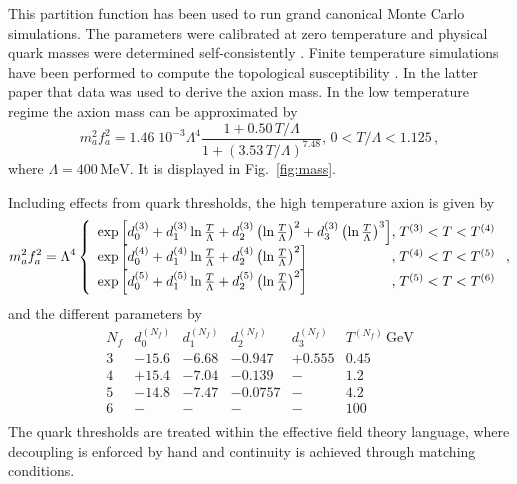 \documentclass[preprint,nofootinbib]{revtex4}
\newcommand{\reffig}[1]{Fig.~\ref{#1}}
\newcommand{\units}[1]{\, \mathrm{#1}}
\begin{document}
This partition function has been used to run grand canonical Monte Carlo simulations. The parameters were calibrated at zero temperature and physical quark masses were determined self-consistently \cite{wantz:iilm:1}. Finite temperature simulations have been performed to compute the topological susceptibility \cite{wantz:iilm:3}. In the latter paper that data was used to derive the axion mass. In the low temperature regime the axion mass can be approximated by
\begin{equation}
m^2_a f^2_a = 1.46\;10^{-3}\Lambda^4 \frac{1+0.50\,T/\Lambda}{\displaystyle 1+\left(3.53\, T/\Lambda\right)^{7.48}},\,  0 < T/\Lambda < 1.125 \,,\label{eq:mass:iilm}
\end{equation}
where $\Lambda=400\units{MeV}$. It is displayed in \reffig{fig:mass}.

Including effects from quark thresholds, the high temperature axion is given by
\begin{equation}
m^2_a f^2_a = \Lambda^4
\left\{
 \begin{array}{l@{,\;}l}
 \exp\left[ d^{(3)}_0 + d^{(3)}_1 \ln\frac{T}{\Lambda} + d^{(3)}_2 \left(\ln\frac{T}{\Lambda}\right)^2 + d^{(3)}_3 \left(\ln\frac{T}{\Lambda}\right)^3 \right] & T^{(3)} < T < T^{(4)}\\
 \exp\left[ d^{(4)}_0 + d^{(4)}_1 \ln\frac{T}{\Lambda} + d^{(4)}_2 \left(\ln\frac{T}{\Lambda}\right)^2 \right] & T^{(4)} < T < T^{(5)}\\
\exp\left[ d^{(5)}_0 + d^{(5)}_1 \ln\frac{T}{\Lambda} + d^{(5)}_2 \left(\ln\frac{T}{\Lambda}\right)^2 \right] & T^{(5)} < T < T^{(6)}\\
\end{array}
\right. ,
\end{equation}
and the different parameters by
\begin{equation}
\begin{array}{c|c|c|c|c|c}
N_f & d^{(N_f)}_0 & d^{(N_f)}_1 & d^{(N_f)}_2 & d^{(N_f)}_3 & T^{(N_f)} \units{GeV} \\\hline\hline
3 & -15.6 & -6.68 & -0.947  & +0.555 & 0.45 \\\hline
4 & +15.4 & -7.04 & -0.139  &   -    & 1.2 \\\hline
5 & -14.8 & -7.47 & -0.0757 &   -    & 4.2 \\\hline
6 &   -   &   -   &   -     &   -    & 100 \\
\end{array} \label{eq:mass:dga:full}
\end{equation}
The quark thresholds are treated within the effective field theory language, where decoupling is enforced by hand and continuity is achieved through matching conditions.
\end{document}

